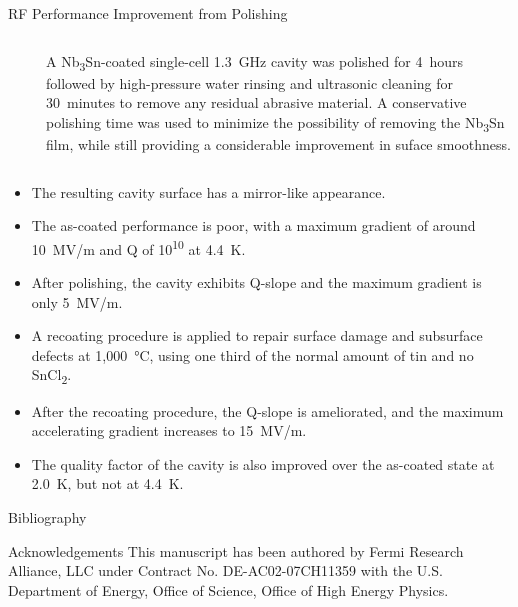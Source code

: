 \documentclass{beamer}
\begin{document}
\begin{frame}{}
\begin{columns}[t]
\begin{column}{0.32\textwidth}
\begin{block}{\label{sec:cavitycbp}RF Performance Improvement from Polishing}
\begin{columns}
\begin{column}{0.55\columnwidth}
\begin{figure}[t]
                            \end{figure}
                        \end{column}
                        \begin{column}{0.4\columnwidth}
                            A Nb\textsubscript{3}Sn-coated single-cell 1.3~GHz cavity was polished for 4~hours followed by high-pressure water rinsing and ultrasonic cleaning for 30~minutes to remove any residual abrasive material. A conservative polishing time was used to minimize the possibility of removing the Nb\textsubscript{3}Sn film, while still providing a considerable improvement in suface smoothness.
                        \end{column}
                    \end{columns}   
                    \begin{itemize}
                        \item The resulting cavity surface has a mirror-like appearance.
                        \item The as-coated performance is poor, with a maximum gradient of around 10~MV/m and Q of 10\textsuperscript{10} at 4.4~K.
                        \item After polishing, the cavity exhibits Q-slope and the maximum gradient is only 5~MV/m.
                        \item A recoating procedure is applied to repair surface damage and subsurface defects at 1,000~°C, using one third of the normal amount of tin and no SnCl\textsubscript{2}.
                        \item After the recoating procedure, the Q-slope is ameliorated, and the maximum accelerating gradient increases to 15~MV/m.
                        \item The quality factor of the cavity is also improved over the as-coated state at 2.0~K, but not at 4.4~K.
                    \end{itemize} 
                \end{block}
                \begin{block}{\label{sec:bibliography}Bibliography}
                    \small
                    
                    
                \end{block}
                \begin{block}{\label{sec:acknowledgements}Acknowledgements}
                    This manuscript has been authored by Fermi Research Alliance, LLC under Contract No. DE-AC02-07CH11359 with the U.S. Department of Energy, Office of Science, Office of High Energy Physics.


\end{block}
\end{column}
\end{columns}
\end{frame}
\end{document}
